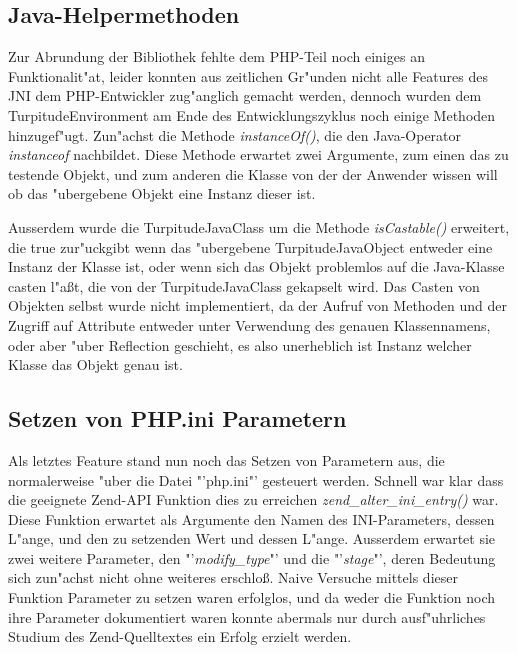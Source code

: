 \subsection{Java-Helpermethoden}
\label{sec:chap1:impl:14}

Zur Abrundung der Bibliothek fehlte dem PHP-Teil noch einiges an Funktionalit"at, leider konnten aus zeitlichen Gr"unden nicht alle 
Features des JNI dem PHP-Entwickler zug"anglich gemacht werden, dennoch wurden dem TurpitudeEnvironment am Ende des Entwicklungszyklus 
noch einige Methoden hinzugef"ugt. Zun"achst die Methode \emph{instanceOf()}, die den Java-Operator \emph{instanceof} nachbildet.
Diese Methode erwartet zwei Argumente, zum einen das zu testende Objekt, und zum anderen die Klasse von der der Anwender wissen will 
ob das "ubergebene Objekt eine Instanz dieser ist. 

Ausserdem wurde die TurpitudeJavaClass um die Methode \emph{isCastable()} erweitert, die true zur"uckgibt wenn das "ubergebene TurpitudeJavaObject
entweder eine Instanz der Klasse ist, oder wenn sich das Objekt problemlos auf die Java-Klasse casten l"a\ss t, die von der TurpitudeJavaClass
gekapselt wird. Das Casten von Objekten selbst wurde nicht implementiert, da der Aufruf von Methoden und der Zugriff auf Attribute
entweder unter Verwendung des genauen Klassennamens, oder aber "uber Reflection geschieht, es also unerheblich ist Instanz welcher Klasse
das Objekt genau ist.

\subsection{Setzen von PHP.ini Parametern}
\label{sec:chap1:impl:15}

Als letztes Feature stand nun noch das Setzen von Parametern aus, die normalerweise "uber die Datei "'php.ini"' gesteuert werden.
Schnell war klar dass die geeignete Zend-API Funktion dies zu erreichen \emph{zend\_alter\_ini\_entry()} war. Diese Funktion erwartet
als Argumente den Namen des INI-Parameters, dessen L"ange, und den zu setzenden Wert und dessen L"ange. Ausserdem erwartet sie zwei
weitere Parameter, den "'\emph{modify\_type}"' und die "'\emph{stage}"', deren Bedeutung sich zun"achst nicht ohne weiteres erschlo\ss .
Naive Versuche mittels dieser Funktion Parameter zu setzen waren erfolglos, und da weder die Funktion noch ihre Parameter dokumentiert
waren konnte abermals nur durch ausf"uhrliches Studium des Zend-Quelltextes ein Erfolg erzielt werden.

